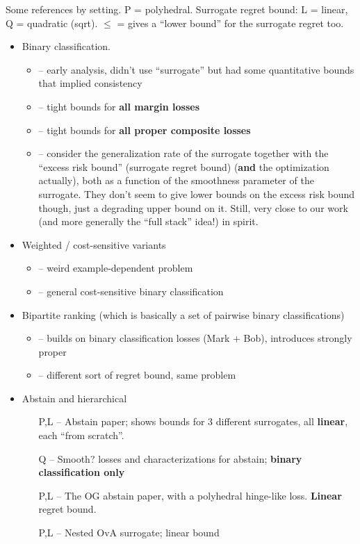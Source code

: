 \documentclass{article}
\theoremstyle{definition}\newtheorem{definition}{Definition}
\theoremstyle{definition}\newtheorem{assumption}{Assumption}
\begin{document}
Some references by setting.  P = polyhedral.  Surrogate regret bound: L = linear, Q = quadratic (sqrt).  $\leq$ = gives a ``lower bound'' for the surrogate regret too.
\begin{itemize}
\item Binary classification.
  \begin{itemize}
  \item \citet{zhang2004statistical} -- early analysis, didn't use ``surrogate'' but had some quantitative bounds that implied consistency
  \item \citet{bartlett2006convexity} -- tight bounds for \textbf{all margin losses}
  \item \citet{reid2009surrogate} -- tight bounds for \textbf{all proper composite losses}
  \item \citet{mahdavi2014binary} -- consider the generalization rate of the surrogate together with the ``excess risk bound'' (surrogate regret bound) (\textbf{and} the optimization actually), both as a function of the smoothness parameter of the surrogate.  They don't seem to give lower bounds on the excess risk bound though, just a degrading upper bound on it.  Still, very close to our work (and more generally the ``full stack'' idea!) in spirit.
  \end{itemize}
  
\item Weighted / cost-sensitive variants
  \begin{itemize}
  \item \citet{scott2011surrogate} -- weird example-dependent problem
  \item \citet{scott2012calibrated} -- general cost-sensitive binary classification
  \end{itemize}
  
\item Bipartite ranking (which is basically a set of pairwise binary classifications)
  \begin{itemize}
  \item \citet{agarwal2014surrogate} -- builds on binary classification losses (Mark + Bob), introduces strongly proper
  \item \citet{menon2016bipartite} -- different sort of regret bound, same problem
  \end{itemize}
  
\item Abstain and hierarchical
  \begin{itemize}
  \item[P,L] \citet{ramaswamy2018consistent} -- Abstain paper; shows bounds for 3 different surrogates, all \textbf{linear}, each ``from scratch''.
  \item[Q] \citet{yuan2010classification} -- Smooth? losses and characterizations for abstain; \textbf{binary classification only}
  \item[P,L] \citet{bartlett2008classification} -- The OG abstain paper, with a polyhedral hinge-like loss.  \textbf{Linear} regret bound.
  \item[P,L] \citet{ramaswamy2015hierarchical} -- Nested OvA surrogate; linear bound
  \end{itemize}


\end{itemize}
\end{document}
